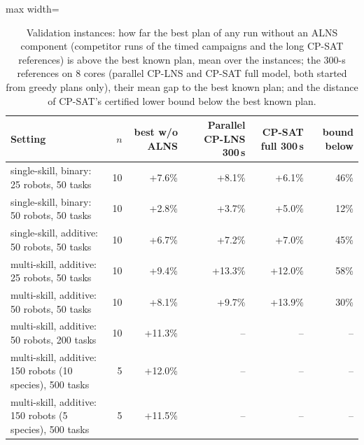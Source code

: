 \begin{table}[h]
\centering
\small
\caption{Validation instances: how far the best plan of any run without an ALNS component (competitor runs of the timed campaigns and the long CP-SAT references) is above the best known plan, mean over the instances; the 300-s references on 8 cores (parallel CP-LNS and CP-SAT full model, both started from greedy plans only), their mean gap to the best known plan; and the distance of CP-SAT's certified lower bound below the best known plan.}
\label{tab:supp-refs}
\begin{adjustbox}{max width=\textwidth}\begin{tabular}{lrrrrr}
\toprule
Setting & $n$ & best w/o ALNS & Parallel CP-LNS 300\,s & CP-SAT full 300\,s & bound below \\
\midrule
single-skill, binary: 25 robots, 50 tasks & 10 & +7.6\% & +8.1\% & +6.1\% & 46\% \\
single-skill, binary: 50 robots, 50 tasks & 10 & +2.8\% & +3.7\% & +5.0\% & 12\% \\
single-skill, additive: 50 robots, 50 tasks & 10 & +6.7\% & +7.2\% & +7.0\% & 45\% \\
multi-skill, additive: 25 robots, 50 tasks & 10 & +9.4\% & +13.3\% & +12.0\% & 58\% \\
multi-skill, additive: 50 robots, 50 tasks & 10 & +8.1\% & +9.7\% & +13.9\% & 30\% \\
multi-skill, additive: 50 robots, 200 tasks & 10 & +11.3\% & -- & -- & -- \\
multi-skill, additive: 150 robots (10 species), 500 tasks & 5 & +12.0\% & -- & -- & -- \\
multi-skill, additive: 150 robots (5 species), 500 tasks & 5 & +11.5\% & -- & -- & -- \\
\bottomrule
\end{tabular}\end{adjustbox}
\end{table}
